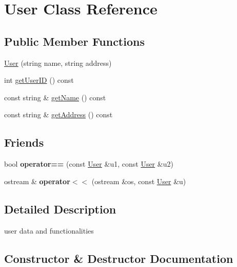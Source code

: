 \hypertarget{class_user}{}\section{User Class Reference}
\label{class_user}
\subsection*{Public Member Functions}
\begin{DoxyCompactItemize}
\item 
\hyperlink{class_user_a7d8f1de813351d98afcfe7f2daf41507}{User} (string name, string address)
\item 
int \hyperlink{class_user_ada4589ad6179f55dcb35ab5afdab78f5}{get\+User\+I\+D} () const 
\item 
const string \& \hyperlink{class_user_ad253dd3bf9b1effaab72e36e13e1d152}{get\+Name} () const 
\item 
const string \& \hyperlink{class_user_aa575209c344804d21452e6de006ef467}{get\+Address} () const 
\end{DoxyCompactItemize}
\subsection*{Friends}
\begin{DoxyCompactItemize}
\item 
\hypertarget{class_user_af6f50d4046256c15aa6b2a061543bfbe}{}bool {\bfseries operator==} (const \hyperlink{class_user}{User} \&u1, const \hyperlink{class_user}{User} \&u2)\label{class_user_af6f50d4046256c15aa6b2a061543bfbe}

\item 
\hypertarget{class_user_a033c555cac168a4b631ea88982e171a8}{}ostream \& {\bfseries operator$<$$<$} (ostream \&os, const \hyperlink{class_user}{User} \&u)\label{class_user_a033c555cac168a4b631ea88982e171a8}

\end{DoxyCompactItemize}


\subsection{Detailed Description}
user data and functionalities 

\subsection{Constructor \& Destructor Documentation}
\hypertarget{class_user_a7d8f1de813351d98afcfe7f2daf41507}{}
